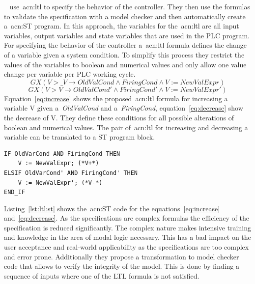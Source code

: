 \citeauthor{Kuzmin:2013}~\cite{Kuzmin:2013} use~\acrshort{acn:ltl} to specify the behavior of the controller.
They then use the formulas to validate the specification with a model checker and then automatically create a~\acrshort{acn:ST} program.
In this approach, the variables for the~\acrshort{acn:ltl} are all input variables, output variables and state variables that are used in the PLC program.
For specifying the behavior of the controller a~\acrfull{acn:ltl} formula defines the change of a variable given a system condition.
To simplify this process they restrict the values of the variables to boolean and numerical values and only allow one value change per variable per PLC working cycle.
\begin{equation}
GX\left(V > \_V \rightarrow OldValCond \land FiringCond \land V := NewValExpr \right)
\label{eq:increase}
\end{equation}
\begin{equation}
GX\left(V > V \rightarrow OldValCond' \land FiringCond' \land V := NewValExpr' \right)
\label{eq:decrease}
\end{equation}
Equation~\ref{eq:increase} shows the proposed~\acrshort{acn:ltl} formula for increasing a variable V given a~\textit{OldValCond} and a~\textit{FiringCond}, equation~\ref{eq:decrease} show the decrease of V.
They define these conditions for all possible alterations of boolean and numerical values.
The pair of~\acrshort{acn:ltl} for increasing and decreasing a variable can be translated to a ST program block.
\lstset{language=Pascal}
\begin{lstlisting}[caption={
Auto-generated~\gls{acn:ST} code realizing the~\acrshort{acn:ltl} formulas~\ref{eq:decrease} and~\ref{eq:increase}.~\cite{Kuzmin:2013}},label=lst:ltl:st]
IF OldVarCond AND FiringCond THEN
    V := NewValExpr; (*V+*)
ELSIF OldVarCond' AND FiringCond' THEN
    V := NewValExpr'; (*V-*)
END_IF
\end{lstlisting}
Listing~\ref{lst:ltl:st} shows the~\acrshort{acn:ST} code for the equations~\ref{eq:increase} and~\ref{eq:decrease}.
As the specifications are complex formulas the efficiency of the specification is reduced significantly.
The complex nature makes intensive training and knowledge in the area of modal logic necessary.
This has a bad impact on the user acceptance and real-world applicability as the specifications are too complex and error prone.
Additionally they propose a transformation to model checker code that allows to verify the integrity of the model.
This is done by finding a sequence of inputs where one of the LTL formula is not satisfied.
